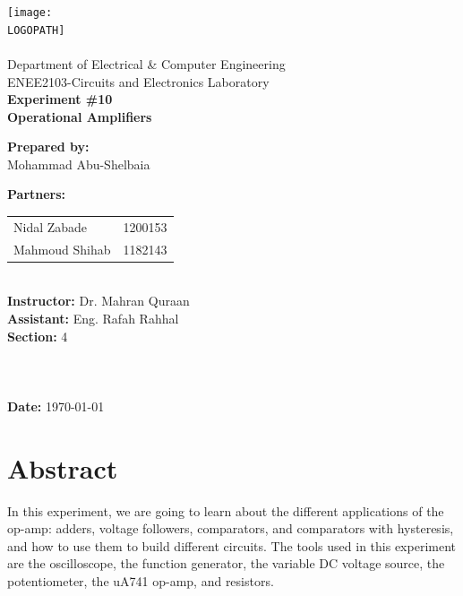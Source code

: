 \documentclass[12pt]{article}
\def \LOGOPATH {assets/birzeit-logo.png}
\def \DEPARTEMENT {Department of Electrical \& Computer Engineering}
\def \COURSENUM {ENEE2103}
\def \COURSENAME {Circuits and Electronics Laboratory}
\def \REPORTTITLE {Operational Amplifiers}
\def \STUDENTNAME {Mohammad Abu-Shelbaia}
\def \STUDENTID {1200198}
\def \INSTRUCTOR {Dr. Mahran Quraan}
\def \ASSISTANT {Eng. Rafah Rahhal}
\def \PARTNERAN {Nidal Zabade}
\def \PARTNERBN {Mahmoud Shihab}
\def \PARTNERAID {1200153}
\def \PARTNERBID {1182143}
\def \REPORTNUM {10}
\begin{document}

\begin{titlepage}
    \vfill
    \begin{center}
        \texttt{[image: \\LOGOPATH]} \\
        \hfill \\
        \Large{\DEPARTEMENT} \\
        \Large{\COURSENUM\;-\;\COURSENAME} \\
        \vfill
        \textbf{\LARGE{Experiment \#\REPORTNUM}} \\
        \textbf{\LARGE{\REPORTTITLE}}
    \end{center}
    \vfill
    \begin{flushleft}
        \Large{\textbf{Prepared by:}\\ \STUDENTNAME\quad\STUDENTID} \\
        \Large{\textbf{Partners:}\\
            \begin{tabular}{@{}l@{\quad}l}
                \PARTNERAN & \PARTNERAID \\
                \PARTNERBN & \PARTNERBID \\
            \end{tabular}} \\
        \Large{\textbf{Instructor:} \INSTRUCTOR} \\
        \Large{\textbf{Assistant:} \ASSISTANT} \\
        \Large{\textbf{Section:} 4}\\
        \LARGE{\textbf{ }}\\
        \LARGE{\textbf{ }}\\
        \LARGE{\textbf{ }}\\
        \Large{\textbf{Date:} \today}\\
    \end{flushleft}
    \vfill
\end{titlepage}
{
\centering
\section*{Abstract}
In this experiment, we are going to learn about the different applications of the op-amp: adders, voltage followers, comparators, and comparators with hysteresis, and how to use them to build different circuits. The tools used in this experiment are the oscilloscope, the function generator, the variable DC voltage source, the potentiometer, the uA741 op-amp, and resistors.
}
\clearpage
\end{document}
